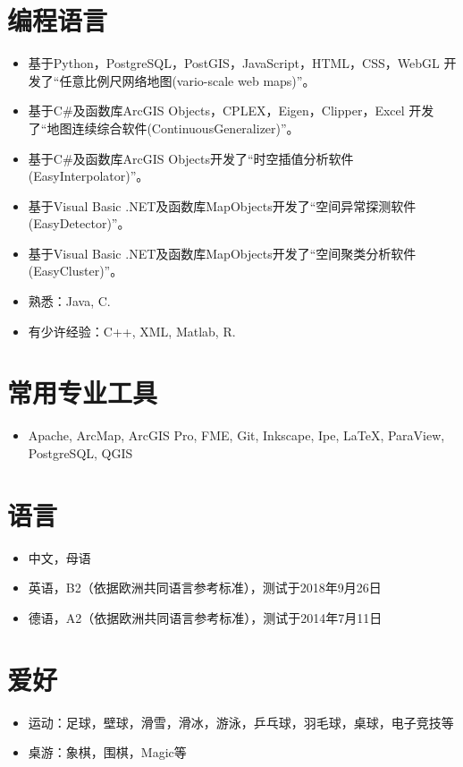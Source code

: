 \documentclass{resume}
\begin{document}
\section{编程语言}
\begin{itemize}[parsep=0ex]
\item 基于Python，PostgreSQL，PostGIS，JavaScript，HTML，CSS，WebGL 
    开发了``任意比例尺网络地图(vario-scale web maps)''。\footnotemark%
\item 基于C\#及函数库ArcGIS Objects，CPLEX，Eigen，Clipper，Excel
    开发了``地图连续综合软件(ContinuousGeneralizer)''。\footnotemark
\item 基于C\#及函数库ArcGIS Objects开发了``时空插值分析软件(EasyInterpolator)''。
\item 基于Visual Basic .NET及函数库MapObjects开发了``空间异常探测软件(EasyDetector)''。
\item 基于Visual Basic .NET及函数库MapObjects开发了``空间聚类分析软件(EasyCluster)''。 
\item 熟悉：Java, C.
\item 有少许经验：C++, XML, Matlab, R.
\end{itemize}


\section{常用专业工具}
\begin{itemize}[parsep=0ex]
\item Apache, ArcMap, ArcGIS Pro, FME, Git, Inkscape, Ipe, 
    LaTeX, ParaView, PostgreSQL, QGIS
\end{itemize}

\section{语言}
\begin{itemize}[parsep=0ex]
\item 中文，母语
\item 英语，B2（依据欧洲共同语言参考标准），测试于2018年9月26日
\item 德语，A2（依据欧洲共同语言参考标准），测试于2014年7月11日
\end{itemize}

\section{爱好}
\begin{itemize}[parsep=0ex]
\item 运动：足球，壁球，滑雪，滑冰，游泳，乒乓球，羽毛球，桌球，电子竞技等
\item 桌游：象棋，围棋，Magic等
\end{itemize}
\end{document}
